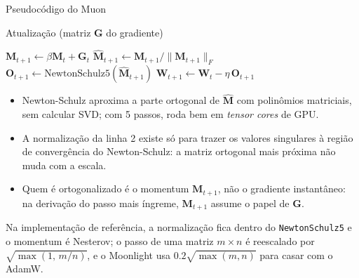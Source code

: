 \documentclass[aspectratio=169,xcolor=dvipsnames]{beamer}
\begin{document}
  \begin{frame}{Pseudocódigo do Muon}
    \begin{block}{Atualização (matriz $\mathbf{G}$ do gradiente)}
      \begin{algorithmic}[1]
        \State $\mathbf{M}_{t+1} \gets \beta \mathbf{M}_{t} + \mathbf{G}_{t}$ 
        \State $\widehat{\mathbf{M}}_{t+1} \gets \mathbf{M}_{t+1}/\|\mathbf{M}_{t+1}\|_{F}$ 
        \State $\mathbf{O}_{t+1} \gets \mathrm{NewtonSchulz5}(\widehat{\mathbf{M}}_{t+1})$ 
        \State $\mathbf{W}_{t+1} \gets \mathbf{W}_{t} - \eta\,\mathbf{O}_{t+1}$
      \end{algorithmic}
    \end{block}
    \begin{itemize}
      \item Newton-Schulz aproxima a parte ortogonal de $\widehat{\mathbf{M}}$ com polinômios
        matriciais, sem calcular SVD; com 5 passos, roda bem em \textit{tensor cores} de GPU.
      \item A normalização da linha 2 existe só para trazer os valores singulares à região
        de convergência do Newton-Schulz: a matriz ortogonal mais próxima não muda com a escala.
      \item Quem é ortogonalizado é o momentum $\mathbf{M}_{t+1}$, não o gradiente instantâneo:
        na derivação do passo mais íngreme, $\mathbf{M}_{t+1}$ assume o papel de $\mathbf{G}$.
    \end{itemize}
    {\footnotesize\color{gray!50!black}Na implementação de referência, a normalização fica
    dentro do \texttt{NewtonSchulz5} e o momentum é Nesterov; o passo de uma matriz $m\times n$
    é reescalado por $\sqrt{\max(1,\,m/n)}$, e o Moonlight usa $0.2\sqrt{\max(m,n)}$ para
    casar com o AdamW.}
  \end{frame}
\end{document}

